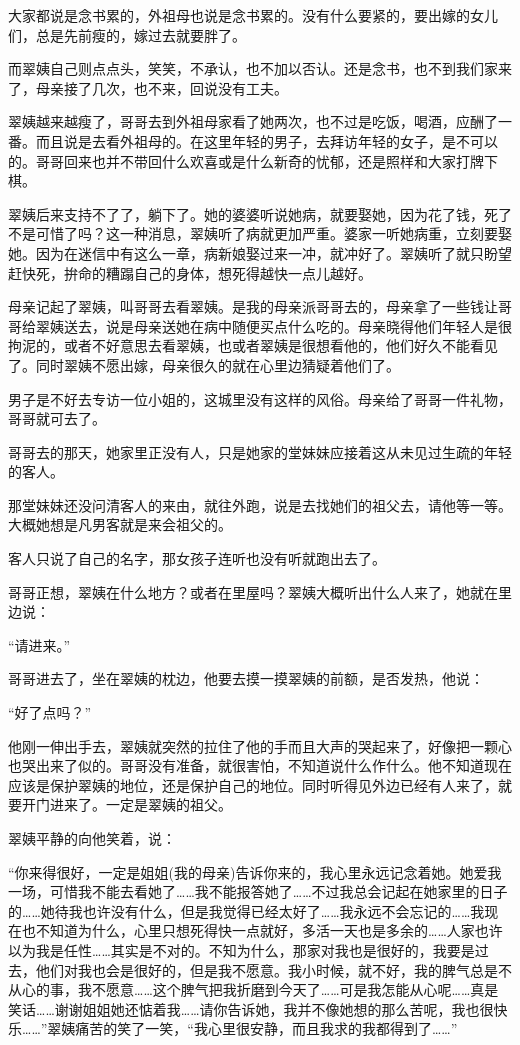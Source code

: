 \par 大家都说是念书累的，外祖母也说是念书累的。没有什么要紧的，要出嫁的女儿们，总是先前瘦的，嫁过去就要胖了。
\par 而翠姨自己则点点头，笑笑，不承认，也不加以否认。还是念书，也不到我们家来了，母亲接了几次，也不来，回说没有工夫。
\par 翠姨越来越瘦了，哥哥去到外祖母家看了她两次，也不过是吃饭，喝酒，应酬了一番。而且说是去看外祖母的。在这里年轻的男子，去拜访年轻的女子，是不可以的。哥哥回来也并不带回什么欢喜或是什么新奇的忧郁，还是照样和大家打牌下棋。
\par 翠姨后来支持不了了，躺下了。她的婆婆听说她病，就要娶她，因为花了钱，死了不是可惜了吗？这一种消息，翠姨听了病就更加严重。婆家一听她病重，立刻要娶她。因为在迷信中有这么一章，病新娘娶过来一冲，就冲好了。翠姨听了就只盼望赶快死，拚命的糟蹋自己的身体，想死得越快一点儿越好。
\par 母亲记起了翠姨，叫哥哥去看翠姨。是我的母亲派哥哥去的，母亲拿了一些钱让哥哥给翠姨送去，说是母亲送她在病中随便买点什么吃的。母亲晓得他们年轻人是很拘泥的，或者不好意思去看翠姨，也或者翠姨是很想看他的，他们好久不能看见了。同时翠姨不愿出嫁，母亲很久的就在心里边猜疑着他们了。
\par 男子是不好去专访一位小姐的，这城里没有这样的风俗。母亲给了哥哥一件礼物，哥哥就可去了。
\par 哥哥去的那天，她家里正没有人，只是她家的堂妹妹应接着这从未见过生疏的年轻的客人。
\par 那堂妹妹还没问清客人的来由，就往外跑，说是去找她们的祖父去，请他等一等。大概她想是凡男客就是来会祖父的。
\par 客人只说了自己的名字，那女孩子连听也没有听就跑出去了。
\par 哥哥正想，翠姨在什么地方？或者在里屋吗？翠姨大概听出什么人来了，她就在里边说：
\par “请进来。”
\par 哥哥进去了，坐在翠姨的枕边，他要去摸一摸翠姨的前额，是否发热，他说：
\par “好了点吗？”
\par 他刚一伸出手去，翠姨就突然的拉住了他的手而且大声的哭起来了，好像把一颗心也哭出来了似的。哥哥没有准备，就很害怕，不知道说什么作什么。他不知道现在应该是保护翠姨的地位，还是保护自己的地位。同时听得见外边已经有人来了，就要开门进来了。一定是翠姨的祖父。
\par 翠姨平静的向他笑着，说：
\par “你来得很好，一定是姐姐(我的母亲)告诉你来的，我心里永远记念着她。她爱我一场，可惜我不能去看她了……我不能报答她了……不过我总会记起在她家里的日子的……她待我也许没有什么，但是我觉得已经太好了……我永远不会忘记的……我现在也不知道为什么，心里只想死得快一点就好，多活一天也是多余的……人家也许以为我是任性……其实是不对的。不知为什么，那家对我也是很好的，我要是过去，他们对我也会是很好的，但是我不愿意。我小时候，就不好，我的脾气总是不从心的事，我不愿意……这个脾气把我折磨到今天了……可是我怎能从心呢……真是笑话……谢谢姐姐她还惦着我……请你告诉她，我并不像她想的那么苦呢，我也很快乐……”翠姨痛苦的笑了一笑，“我心里很安静，而且我求的我都得到了……”
